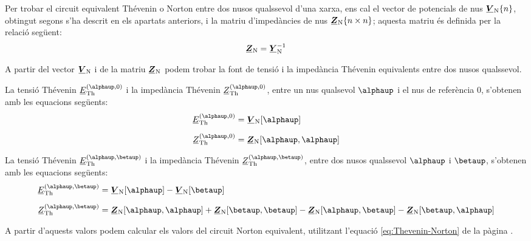 Per trobar el
circuit equivalent Thévenin o Norton entre dos nusos qualssevol
d'una xarxa, ens cal el vector de potencials de nus
$\mcmplx{V}\ped{N}\{n\}$, obtingut segons s'ha descrit en els
apartats anteriors, i la matriu d'impedàncies de nus
$\mcmplx{Z}\ped{N}\{n\times n\}$; aquesta matriu és definida per
la relació següent:
\begin{equation}
   \mcmplx{Z}\ped{N} = \mcmplx{Y}\ped{N}^{-1}
\end{equation}

A partir del vector $\mcmplx{V}\ped{N}$ i de la matriu
$\mcmplx{Z}\ped{N}$ podem trobar la font de tensió i la impedància
Thévenin equivalents entre dos nusos qualssevol.

La tensió Thévenin $\cmplx{E}\ped{Th}^{(\alphaup,0)}$ i la impedància
Thévenin $\cmplx{Z}\ped{Th}^{(\alphaup,0)}$, entre  un nus qualsevol
$\alphaup$ i el nus de referència 0, s'obtenen amb les equacions
següents:
\begin{align}
    \cmplx{E}\ped{Th}^{(\alphaup,0)} &= \mcmplx{V}\ped{N}[\alphaup] \\[2mm]
    \cmplx{Z}\ped{Th}^{(\alphaup,0)} &= \mcmplx{Z}\ped{N}[\alphaup,\alphaup]
\end{align}

La tensió Thévenin $\cmplx{E}\ped{Th}^{(\alphaup,\betaup)}$ i la
impedància Thévenin $\cmplx{Z}\ped{Th}^{(\alphaup,\betaup)}$, entre dos
nusos qualssevol $\alphaup$ i $\betaup$, s'obtenen amb les equacions
següents:
\begin{align}
    \cmplx{E}\ped{Th}^{(\alphaup,\betaup)} &= \mcmplx{V}\ped{N}[\alphaup] - \mcmplx{V}\ped{N}[\betaup] \\[2mm]
    \cmplx{Z}\ped{Th}^{(\alphaup,\betaup)} &= \mcmplx{Z}\ped{N}[\alphaup,\alphaup] +
    \mcmplx{Z}\ped{N}[\betaup,\betaup] - \mcmplx{Z}\ped{N}[\alphaup,\betaup] -
    \mcmplx{Z}\ped{N}[\betaup,\alphaup]
\end{align}

A partir d'aquests valors podem calcular els valors del circuit Norton equivalent, utilitzant l'equació \eqref{eq:Thevenin-Norton} de la pàgina \pageref{eq:Thevenin-Norton}.


